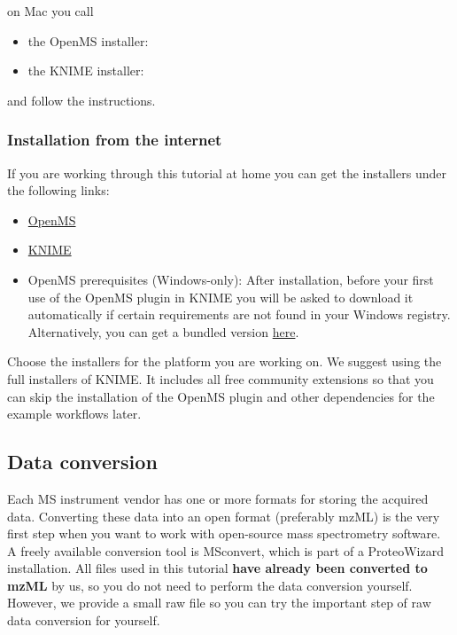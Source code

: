 on Mac you call
\begin{itemize}
  \item the OpenMS installer: \directory{\MacOpenMSInstallerName}
  \item the KNIME installer: \directory{\MacKnimeInstallerName}
\end{itemize}

and follow the instructions. 

\subsubsection{Installation from the internet}
If you are working through this tutorial at home you can get the installers under the following links:
\begin{itemize}
  \item \href{http://www.openms.de/downloads}{OpenMS}
  \item \href{https://www.knime.org/downloads/overview}{KNIME}
  \item OpenMS prerequisites (Windows-only): After installation, before your first use of the OpenMS plugin in KNIME you will be asked to download it automatically if certain requirements are not found in your Windows registry. Alternatively, you can get a bundled version \href{\WindowsPrerequisitesLink}{here}.
\end{itemize}
Choose the installers for the platform you are working on. We suggest using the full installers of KNIME. It includes all free community extensions so that you can skip the installation of the OpenMS plugin and other dependencies for the example workflows later.

\subsection{Data conversion}
\label{Data_Conversion}

Each MS instrument vendor has one or more formats for storing the acquired data. Converting these data into an open format (preferably mzML) is the very first step when you want to work with open-source mass spectrometry software. A freely available conversion tool is MSconvert, which is part of a ProteoWizard installation. All files used in this tutorial \textbf{have already been converted to mzML} by us, so you do not need to perform the data conversion yourself.
However, we provide a small raw file so you can try the important step of raw data conversion for yourself.


